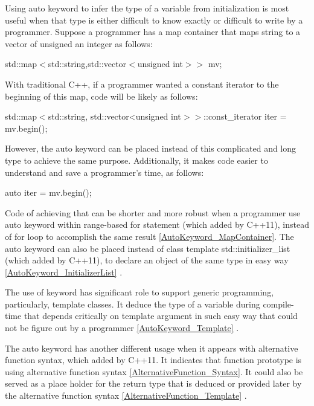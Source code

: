 \documentclass[11pt]{report}
\begin{document}
\begin{enumerate}
Using auto keyword to infer the type of a variable from initialization is most useful when that type is either difficult to know exactly or difficult to write by a programmer. Suppose a programmer has a map container that maps string to a vector of unsigned an integer as follows: 

\begin{center}
std::map$<$std::string,std::vector$<$unsigned int$>>$ mv;
\end{center}

With traditional C++, if a programmer wanted a constant iterator to the beginning of this map, code will be likely as follows:

\begin{center}
std::map$<$std::string, std::vector<unsigned int$>>$::const\_iterator iter = mv.begin();
\end{center}

However, the auto keyword can be placed instead of this complicated and long type to achieve the same purpose. Additionally, it makes code easier to understand and save a programmer's time, as follows:

\begin{center}
auto iter = mv.begin();
\end{center}

Code of achieving that can be shorter and more robust when a programmer use auto keyword within range-based for statement (which added by C++11), instead of for loop to accomplish the same result \ref{AutoKeyword_MapContainer}. The auto keyword can also be placed instead of class template std::initializer\_list (which added by C++11), to declare an object of the same type in easy way \ref{AutoKeyword_InitializerList} \cite{Gregorie:professionalcpp}.
\newline

The use of keyword has significant role to support generic programming, particularly, template classes. It deduce the type of a variable  during compile- time that depends critically on template argument in such easy way that could not be figure out by a programmer \ref{AutoKeyword_Template} \cite{Stroustrup:2012:Cpp11}.
\newline

The auto keyword has another different usage when it appears with alternative function syntax, which added by C++11. It indicates that function prototype is using alternative function syntax \ref{AlternativeFunction_Syntax}. It could also be served as a place holder for the return type that is deduced or provided later by the alternative function syntax \ref{AlternativeFunction_Template} \cite{Prata:2012:Cpp}.
\newline


\end{enumerate}
\end{document}
